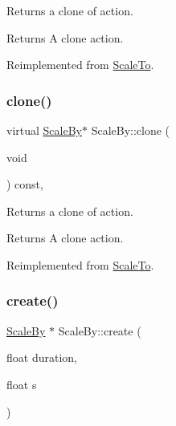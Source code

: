 Returns a clone of action.

\begin{DoxyReturn}{Returns}
A clone action. 
\end{DoxyReturn}


Reimplemented from \hyperlink{classScaleTo_a02707ca35819eabf4cc14909fec9a348}{Scale\+To}.

\mbox{\label{classScaleBy_abce00bc9338d8fc1fe3a765b62947d1d}} 
\subsubsection{\texorpdfstring{clone()}{clone()}\hspace{0.1cm}{\footnotesize\ttfamily [2/2]}}
{\footnotesize\ttfamily virtual \hyperlink{classScaleBy}{Scale\+By}$\ast$ Scale\+By\+::clone (\begin{DoxyParamCaption}\item[{void}]{ }\end{DoxyParamCaption}) const\hspace{0.3cm}{\ttfamily [override]}, {\ttfamily [virtual]}}

Returns a clone of action.

\begin{DoxyReturn}{Returns}
A clone action. 
\end{DoxyReturn}


Reimplemented from \hyperlink{classScaleTo_a02707ca35819eabf4cc14909fec9a348}{Scale\+To}.

\mbox{\label{classScaleBy_ad0154531b07e51d3f1100e93d74bf8c6}} 
\subsubsection{\texorpdfstring{create()}{create()}\hspace{0.1cm}{\footnotesize\ttfamily [1/6]}}
{\footnotesize\ttfamily \hyperlink{classScaleBy}{Scale\+By} $\ast$ Scale\+By\+::create (\begin{DoxyParamCaption}\item[{float}]{duration,  }\item[{float}]{s }\end{DoxyParamCaption})\hspace{0.3cm}{\ttfamily [static]}}

